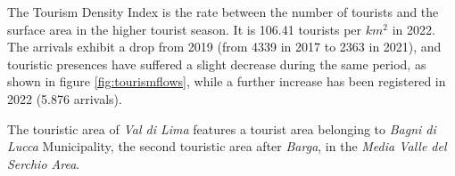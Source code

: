 \documentclass[sustainability,article,submit,pdftex,moreauthors]{Definitions/mdpi}
\begin{document}

The Tourism Density Index is the rate between the number of tourists and the surface area in the higher tourist season. It is 106.41 tourists per $km^2$ in 2022. The arrivals exhibit a drop from 2019 (from  4339 in 2017 to 2363 in 2021), and touristic presences have suffered a slight decrease during the same period, as shown in figure \ref{fig:tourismflows}, while a further increase has been registered in 2022 (5.876 arrivals).

The touristic area of \emph{Val di Lima} features a tourist area belonging to \emph{Bagni di Lucca} Municipality, the second touristic area after \textit{Barga}, in the \textit{Media Valle del Serchio Area}.


\end{document}
